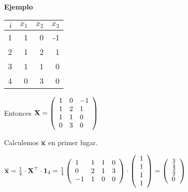 \begin{frame}
\textbf{Ejemplo}
\vskip 0.5cm
\begin{tabular}{|r||r|r|r|}
\hline
$i$&$x_1$&$x_2$&$x_3$
\\\hline\hline
1 & 1 & 0 & -1 \\
2 & 1 & 2 & 1 \\
3 & 1 & 1 & 0 \\
4 &0 & 3 & 0\\ \hline
\end{tabular}

Entonces 
$\mathbf{X}=\left(
\begin{array}{lll}
 1 & 0 & -1 \\
 1 & 2 & 1 \\
 1 & 1 & 0 \\
 0 & 3 & 0
\end{array}
\right)$

Calculemos $\overline{\mathbf{x}}$  en primer lugar.

$\overline{\mathbf{x}}=\frac{1}{4}\cdot \mathbf{X}^\top\cdot \mathbf{1}_4=
\frac{1}{4}
\left(
\begin{array}{llll}
 1 & 1 & 1 & 0 \\
 0 & 2 & 1 & 3 \\
 -1 & 1 & 0 & 0
\end{array}
\right)
\cdot
\left(
\begin{array}{l}
 1 \\
 1 \\
 1 \\
 1
\end{array}
\right)=
\left(
\begin{array}{l}
 \frac{3}{4} \\
 \frac{3}{2} \\
 0
\end{array}
\right)$
\end{frame}

